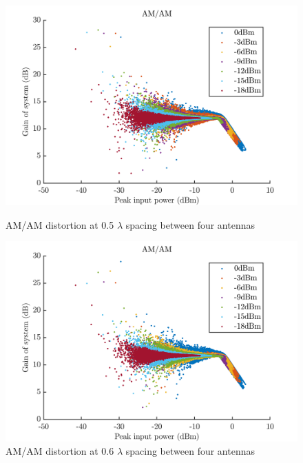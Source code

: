 \begin{figure}[H]
  \centering
  \begin{minipage}[b]{0.5\textwidth}
	\includegraphics[scale = 0.5]{figures/measurement/four_antenna/amam_0p5.png}
	\caption{AM/AM distortion at 0.5 $\lambda$ spacing between four antennas}
    \label{fig:amam05_4}
  \end{minipage}
  \hfill
  \begin{minipage}[b]{0.4\textwidth}
\includegraphics[scale = 0.5]{figures/measurement/four_antenna/amam_0p6.png}
\caption{AM/AM distortion at 0.6 $\lambda$ spacing between four antennas}
    \label{fig:amam06_4}
  \end{minipage}
\end{figure}


